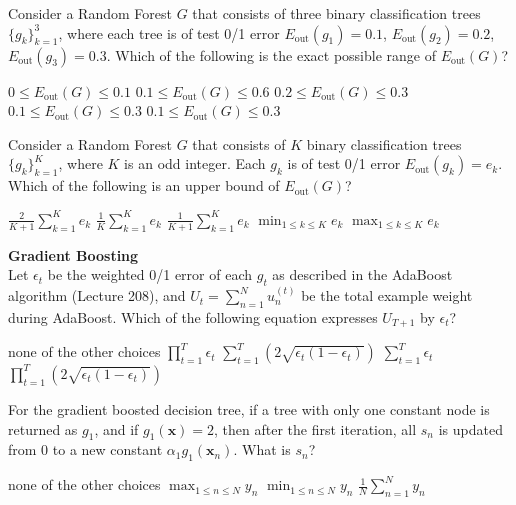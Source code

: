 \documentclass[a4paper,10pt]{exam}
\begin{document}
\begin{questions}
		\question Consider a Random Forest $G$ that consists of three binary classification trees $\{g_k\}_{k=1}^3$, where each tree is of test 0/1 error $E_{\text{out}}(g_1) = 0.1$, $E_{\text{out}}(g_2) = 0.2$, $E_{\text{out}}(g_3) = 0.3$. Which of the following is the exact possible range of $E_{\text{out}}(G)$?
		\begin{checkboxes}
			\choice $0 \le E_{\text{out}}(G) \le 0.1$
			\choice $0.1 \le E_{\text{out}}(G) \le 0.6$
			\choice $0.2 \le E_{\text{out}}(G) \le 0.3$
			\choice $0.1 \le E_{\text{out}}(G) \le 0.3$
			\CorrectChoice $0.1 \le E_{\text{out}}(G) \le 0.3$\\
		\end{checkboxes}
		
		\question Consider a Random Forest $G$ that consists of $K$ binary classification trees $\{g_k\}_{k=1}^K$, where $K$ is an odd integer. Each $g_k$ is of test 0/1 error $E_{\text{out}}(g_k) = e_k$. Which of the following is an upper bound of $E_{\text{out}}(G)$?
		\begin{checkboxes}
			\CorrectChoice $\frac{2}{K+1} \sum_{k=1}^K e_k$
			\choice $\frac{1}{K} \sum_{k=1}^K e_k$
			\choice $\frac{1}{K+1} \sum_{k=1}^K e_k$
			\choice $\min_{1 \le k \le K} e_k$
			\choice $\max_{1 \le k \le K} e_k$\\
		\end{checkboxes}
		
		\question \textbf{Gradient Boosting}\\
		Let $\epsilon_t$ be the weighted 0/1 error of each $g_t$ as described in the AdaBoost algorithm (Lecture 208), and $U_t = \sum_{n=1}^N u_n^{(t)}$ be the total example weight during AdaBoost. Which of the following equation expresses $U_{T+1}$ by $\epsilon_t$?
		\begin{checkboxes}
			\choice none of the other choices
			\choice $\prod_{t=1}^T \epsilon_t$
			\choice $\sum_{t=1}^T (2 \sqrt{\epsilon_t(1-\epsilon_t)})$
			\choice $\sum_{t=1}^T \epsilon_t$
			\CorrectChoice $\prod_{t=1}^T (2 \sqrt{\epsilon_t(1-\epsilon_t)})$\\
		\end{checkboxes}
		
		\question For the gradient boosted decision tree, if a tree with only one constant node is returned as $g_1$, and if $g_1(\mathbf{x}) = 2$, then after the first iteration, all $s_n$ is updated from $0$ to a new constant $\alpha_1 g_1(\mathbf{x}_n)$. What is $s_n$?
		
		\begin{checkboxes}
			\choice 2
			\choice none of the other choices
			\choice $\max_{1 \le n \le N} y_n$
			\choice $\min_{1 \le n \le N} y_n$
			\CorrectChoice $\frac{1}{N} \sum_{n=1}^N y_n$\\
		\end{checkboxes}
		

\end{questions}
\end{document}
